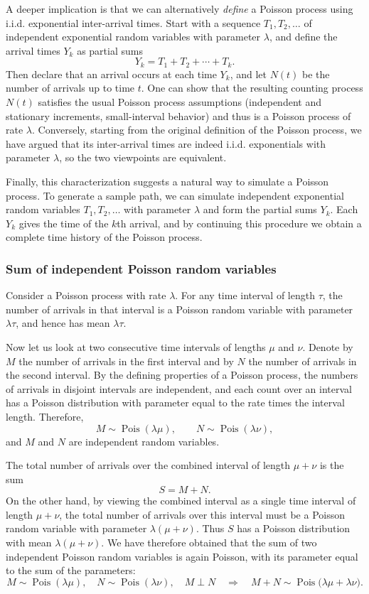 A deeper implication is that we can alternatively \textit{define} a Poisson process using i.i.d. exponential inter-arrival times.  
Start with a sequence \(T_1, T_2, \dots\) of independent exponential random variables with parameter \(\lambda\), and define the arrival times \(Y_k\) as partial sums
\[
Y_k = T_1 + T_2 + \cdots + T_k.
\]
Then declare that an arrival occurs at each time \(Y_k\), and let \(N(t)\) be the number of arrivals up to time \(t\).  
One can show that the resulting counting process \(N(t)\) satisfies the usual Poisson process assumptions (independent and stationary increments, small-interval behavior) and thus is a Poisson process of rate \(\lambda\).  
Conversely, starting from the original definition of the Poisson process, we have argued that its inter-arrival times are indeed i.i.d. exponentials with parameter \(\lambda\), so the two viewpoints are equivalent.  

Finally, this characterization suggests a natural way to simulate a Poisson process.  
To generate a sample path, we can simulate independent exponential random variables \(T_1, T_2, \dots\) with parameter \(\lambda\) and form the partial sums \(Y_k\).  
Each \(Y_k\) gives the time of the \(k\)th arrival, and by continuing this procedure we obtain a complete time history of the Poisson process.


\subsubsection{Sum of independent Poisson random variables}

Consider a Poisson process with rate \(\lambda\).  
For any time interval of length \(\tau\), the number of arrivals in that interval is a Poisson random variable with parameter \(\lambda \tau\), and hence has mean \(\lambda \tau\).  

Now let us look at two consecutive time intervals of lengths \(\mu\) and \(\nu\).  
Denote by \(M\) the number of arrivals in the first interval and by \(N\) the number of arrivals in the second interval.  
By the defining properties of a Poisson process, the numbers of arrivals in disjoint intervals are independent, and each count over an interval has a Poisson distribution with parameter equal to the rate times the interval length.  
Therefore,
\[
M \sim \operatorname{Pois}(\lambda \mu),
\qquad
N \sim \operatorname{Pois}(\lambda \nu),
\]
and \(M\) and \(N\) are independent random variables.  

The total number of arrivals over the combined interval of length \(\mu + \nu\) is the sum
\[
S = M + N.
\]
On the other hand, by viewing the combined interval as a single time interval of length \(\mu + \nu\), the total number of arrivals over this interval must be a Poisson random variable with parameter \(\lambda (\mu + \nu)\).  
Thus \(S\) has a Poisson distribution with mean \(\lambda (\mu + \nu)\).  
We have therefore obtained that the sum of two independent Poisson random variables is again Poisson, with its parameter equal to the sum of the parameters:
\[
M \sim \operatorname{Pois}(\lambda \mu),
\quad
N \sim \operatorname{Pois}(\lambda \nu),
\quad
M \perp N
\quad \Longrightarrow \quad
M + N \sim \operatorname{Pois}\big(\lambda \mu + \lambda \nu\big).
\]

